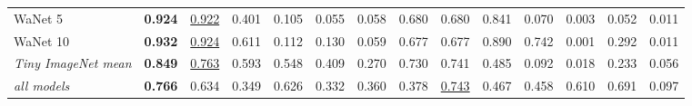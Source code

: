 \begin{table}[htbp]
\begin{adjustbox}{max width=\textwidth}
\begin{tabular}{lrrrrrrrrrrrrr}
WaNet 5 & \textbf{0.924} & \underline{0.922} & \textcolor{black!45}{0.401} & \textcolor{black!45}{0.105} & \textcolor{black!45}{0.055} & \textcolor{black!45}{0.058} & 0.680 & 0.680 & 0.841 & \textcolor{black!45}{0.070} & \textcolor{black!45}{0.003} & \textcolor{black!45}{0.052} & \textcolor{black!45}{0.011} \\
WaNet 10 & \textbf{0.932} & \underline{0.924} & 0.611 & \textcolor{black!45}{0.112} & \textcolor{black!45}{0.130} & \textcolor{black!45}{0.059} & 0.677 & 0.677 & 0.890 & 0.742 & \textcolor{black!45}{0.001} & \textcolor{black!45}{0.292} & \textcolor{black!45}{0.011} \\
\rowcolor{black!8}\emph{Tiny ImageNet mean} & \textbf{0.849} & \underline{0.763} & 0.593 & 0.548 & \textcolor{black!45}{0.409} & \textcolor{black!45}{0.270} & 0.730 & 0.741 & \textcolor{black!45}{0.485} & \textcolor{black!45}{0.092} & \textcolor{black!45}{0.018} & \textcolor{black!45}{0.233} & \textcolor{black!45}{0.056} \\
\rowcolor{black!8}\emph{all models} & \textbf{0.766} & 0.634 & \textcolor{black!45}{0.349} & 0.626 & \textcolor{black!45}{0.332} & \textcolor{black!45}{0.360} & \textcolor{black!45}{0.378} & \underline{0.743} & \textcolor{black!45}{0.467} & \textcolor{black!45}{0.458} & 0.610 & 0.691 & \textcolor{black!45}{0.097} \\
\bottomrule
\end{tabular}
\end{adjustbox}
\end{table}
